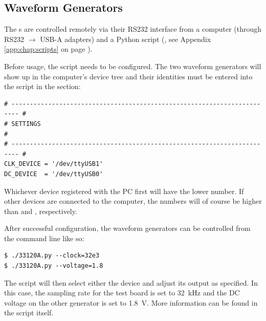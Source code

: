
\subsection{Waveform Generators}
\label{subsec:33120A}

The  \funcgen  s  are  controlled  remotely via  their  RS232  interface  from
a  computer  (through  RS232  $\rightarrow$   USB-A  adapters)  and  a  Python
script   (,  see   Appendix  \ref{app:chap:scripts}   on  page
\pageref{app:chap:scripts}).

Before usage, the  script needs to be configured. The  two waveform generators
will  show up  in the  computer's  device tree  and their  identities must  be
entered into the script in the  section:

\begin{verbatim}
# ------------------------------------------------------------------------ #
# SETTINGS                                                                 #
# ------------------------------------------------------------------------ #
CLK_DEVICE = '/dev/ttyUSB1'
DC_DEVICE  = '/dev/ttyUSB0'
\end{verbatim}

Whichever  device   registered  with  the   PC  first  will  have   the  lower
 number. If other  devices are connected to  the computer, the
numbers will of course be higher than  and , respectively.

After successful configuration, the waveform generators can be controlled from
the command line like so\footnotemark:

\begin{verbatim}
$ ./33120A.py --clock=32e3
$ ./33120A.py --voltage=1.8
\end{verbatim}

The script will then select either the   device
and adjust  its output as specified. In  this case, the sampling  rate for the
test board  is set  to \SI{32}{\kilo\hertz}  and the DC  voltage on  the other
generator  is set  to \SI{1.8}{\volt}. More  information can  be found  in the
script itself.

